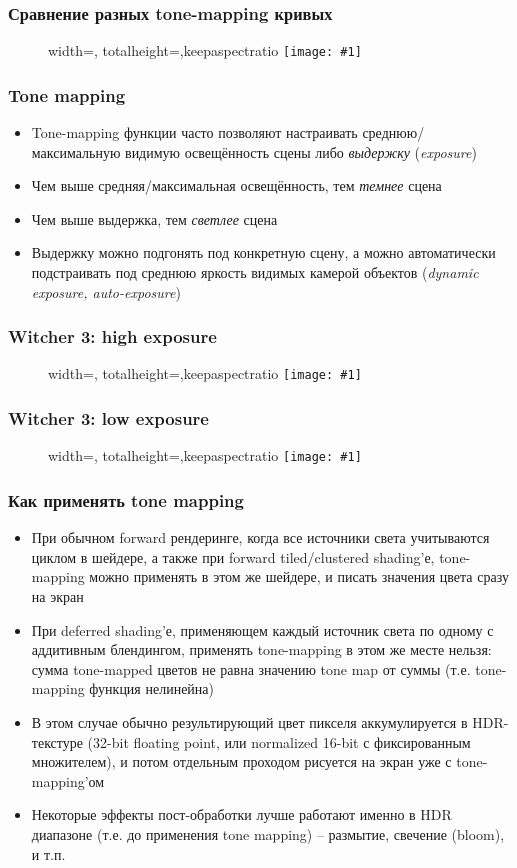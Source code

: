 \documentclass[10pt]{beamer}
\newcommand{\slideimage}[1]{
  \begin{figure}
    \begin{adjustbox}{width=\textwidth, totalheight=\textheight-2\baselineskip-2\baselineskip,keepaspectratio}
      \texttt{[image: \#1]}
    \end{adjustbox}
  \end{figure}
}
\begin{document}
\begin{frame}[fragile]
\frametitle{Сравнение разных tone-mapping кривых}
\slideimage{tone_mapping.png}
\end{frame}

\begin{frame}[fragile]
\frametitle{Tone mapping}
\begin{itemize}
\item Tone-mapping функции часто позволяют настраивать среднюю/максимальную видимую освещённость сцены либо \textit{выдержку} (\textit{exposure})
\pause
\item Чем выше средняя/максимальная освещённость, тем \textit{темнее} сцена
\pause
\item Чем выше выдержка, тем \textit{светлее} сцена
\pause
\item Выдержку можно подгонять под конкретную сцену, а можно автоматически подстраивать под среднюю яркость видимых камерой объектов (\textit{dynamic exposure, auto-exposure})
\end{itemize}
\end{frame}

\begin{frame}[fragile]
\frametitle{Witcher 3: high exposure}
\slideimage{witcher_hdr_inside.png}
\end{frame}

\begin{frame}[fragile]
\frametitle{Witcher 3: low exposure}
\slideimage{witcher_hdr_outside.png}
\end{frame}

\begin{frame}[fragile]
\frametitle{Как применять tone mapping}
\begin{itemize}
\item При обычном forward рендеринге, когда все источники света учитываются циклом в шейдере, а также при forward tiled/clustered shading'е, tone-mapping можно применять в этом же шейдере, и писать значения цвета сразу на экран
\pause
\item При deferred shading'е, применяющем каждый источник света по одному с аддитивным блендингом, применять tone-mapping в этом же месте нельзя: сумма tone-mapped цветов не равна значению tone map от суммы (т.е. tone-mapping функция нелинейна)
\pause
\item В этом случае обычно результирующий цвет пикселя аккумулируется в HDR-текстуре (32-bit floating point, или normalized 16-bit с фиксированным множителем), и потом отдельным проходом рисуется на экран уже с tone-mapping'ом
\pause
\item Некоторые эффекты пост-обработки лучше работают именно в HDR диапазоне (т.е. до применения tone mapping) -- размытие, свечение (bloom), и т.п.
\end{itemize}
\end{frame}
\end{document}
